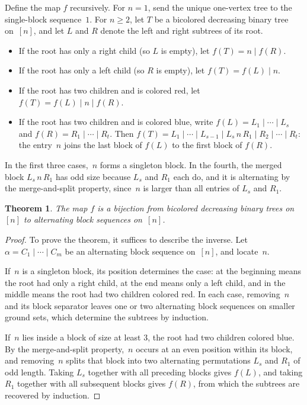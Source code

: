 \documentclass[10pt]{article}
\theoremstyle{plain}
\newtheorem{theorem}{Theorem}[section]
\begin{document}
Define the map $f$ recursively. For $n = 1$, send the unique one-vertex tree to the single-block sequence~$1$. For $n \geq 2$, let $T$ be a bicolored decreasing binary tree on~$[n]$, and let $L$ and $R$ denote the left and right subtrees of its root.

\begin{itemize}[itemsep=0pt]
\item If the root has only a right child (so $L$ is empty), let $f(T) = n \mid f(R)$.
\item If the root has only a left child (so $R$ is empty), let $f(T) = f(L) \mid n$.
\item If the root has two children and is colored red, let $f(T) = f(L) \mid n \mid f(R)$.
\item If the root has two children and is colored blue, write $f(L) = L_1 \mid \cdots \mid L_s$ and $f(R) = R_1 \mid \cdots \mid R_t$. Then $f(T) = L_1 \mid \cdots \mid L_{s-1} \mid L_s\, n\, R_1 \mid R_2 \mid \cdots \mid R_t$: the entry~$n$ joins the last block of $f(L)$ to the first block of $f(R)$.
\end{itemize}

In the first three cases,~$n$ forms a singleton block. In the fourth, the merged block $L_s\, n\, R_1$ has odd size because $L_s$ and $R_1$ each do, and it is alternating by the merge-and-split property, since~$n$ is larger than all entries of $L_s$ and $R_1$.

\begin{theorem}
\label{thm:bijection-blocks}
The map $f$ is a bijection from bicolored decreasing binary trees on~$[n]$ to alternating block sequences on~$[n]$.
\end{theorem}

\begin{proof}
To prove the theorem, it suffices to describe the inverse. Let $\alpha = C_1 \mid \cdots \mid C_m$ be an alternating block sequence on~$[n]$, and locate~$n$.

If~$n$ is a singleton block, its position determines the case: at the beginning means the root had only a right child, at the end means only a left child, and in the middle means the root had two children colored red. In each case, removing~$n$ and its block separator leaves one or two alternating block sequences on smaller ground sets, which determine the subtrees by induction.

If~$n$ lies inside a block of size at least $3$, the root had two children colored blue. By the merge-and-split property,~$n$ occurs at an even position within its block, and removing~$n$ splits that block into two alternating permutations $L_s$ and $R_1$ of odd length. Taking $L_s$ together with all preceding blocks gives $f(L)$, and taking $R_1$ together with all subsequent blocks gives $f(R)$, from which the subtrees are recovered by induction.
\end{proof}
\end{document}
